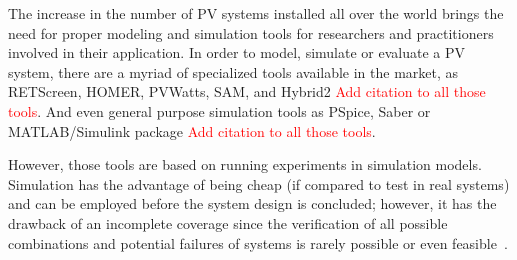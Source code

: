 \documentclass[journal]{IEEEtran}
\begin{document}
The increase in the number of PV systems installed all over the world brings the need for proper modeling and simulation tools for researchers and practitioners involved in their application. In order to model, simulate or evaluate a PV system, there are a myriad of specialized tools available in the market, as RETScreen, HOMER, PVWatts, SAM, and Hybrid2 \textcolor{red}{Add citation to all those tools}. And even general purpose simulation tools as PSpice, Saber or MATLAB/Simulink package \textcolor{red}{Add citation to all those tools}.

%
%
%
%
However, those tools are based on running experiments in simulation models. Simulation has the advantage of being cheap (if compared to test in real systems) and can be employed before the system design is concluded; however, it has the drawback of an incomplete coverage since the verification of all possible combinations and potential failures of systems is rarely possible or even feasible~\cite{Clarke2008}.
\end{document}
